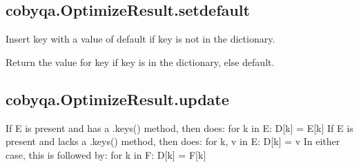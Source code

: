 \documentclass[letterpaper,10pt,english]{sphinxmanual}
\begin{document}
\begin{fulllineitems}
\begin{fulllineitems}
\end{fulllineitems}



\subsection{cobyqa.OptimizeResult.setdefault}
\label{\detokenize{refs/generated/cobyqa.OptimizeResult.setdefault:cobyqa-optimizeresult-setdefault}}\label{\detokenize{refs/generated/cobyqa.OptimizeResult.setdefault::doc}}

\begin{fulllineitems}
\label{\detokenize{refs/generated/cobyqa.OptimizeResult.setdefault:cobyqa.OptimizeResult.setdefault}}
\sphinxAtStartPar
Insert key with a value of default if key is not in the dictionary.

\sphinxAtStartPar
Return the value for key if key is in the dictionary, else default.

\end{fulllineitems}



\subsection{cobyqa.OptimizeResult.update}
\label{\detokenize{refs/generated/cobyqa.OptimizeResult.update:cobyqa-optimizeresult-update}}\label{\detokenize{refs/generated/cobyqa.OptimizeResult.update::doc}}

\begin{fulllineitems}
\label{\detokenize{refs/generated/cobyqa.OptimizeResult.update:cobyqa.OptimizeResult.update}}
\sphinxAtStartPar
If E is present and has a .keys() method, then does:  for k in E: D{[}k{]} = E{[}k{]}
If E is present and lacks a .keys() method, then does:  for k, v in E: D{[}k{]} = v
In either case, this is followed by: for k in F:  D{[}k{]} = F{[}k{]}


\end{fulllineitems}
\end{fulllineitems}
\end{document}
